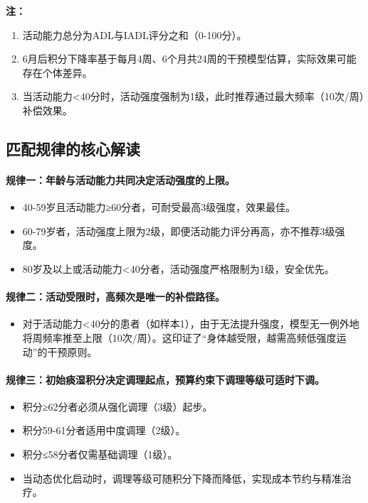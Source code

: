\documentclass[12pt,a4paper]{article}
\begin{document}
{\small
\textbf{注：}
\begin{enumerate}[leftmargin=*, nosep]
    \item 活动能力总分为ADL与IADL评分之和（0-100分）。
    \item 6月后积分下降率基于每月4周、6个月共24周的干预模型估算，实际效果可能存在个体差异。
    \item 当活动能力<40分时，活动强度强制为1级，此时推荐通过最大频率（10次/周）补偿效果。
\end{enumerate}
}

\subsection{匹配规律的核心解读}

\paragraph{规律一：年龄与活动能力共同决定活动强度的上限。}
\begin{itemize}
    \item 40-59岁且活动能力≥60分者，可耐受最高3级强度，效果最佳。
    \item 60-79岁者，活动强度上限为2级，即便活动能力评分再高，亦不推荐3级强度。
    \item 80岁及以上或活动能力<40分者，活动强度严格限制为1级，安全优先。
\end{itemize}

\paragraph{规律二：活动受限时，高频次是唯一的补偿路径。}
\begin{itemize}
    \item 对于活动能力<40分的患者（如样本1），由于无法提升强度，模型无一例外地将周频率推至上限（10次/周）。这印证了“身体越受限，越需高频低强度运动”的干预原则。
\end{itemize}

\paragraph{规律三：初始痰湿积分决定调理起点，预算约束下调理等级可适时下调。}
\begin{itemize}
    \item 积分≥62分者必须从强化调理（3级）起步。
    \item 积分59-61分者适用中度调理（2级）。
    \item 积分≤58分者仅需基础调理（1级）。
    \item 当动态优化启动时，调理等级可随积分下降而降低，实现成本节约与精准治疗。
\end{itemize}
\end{document}
